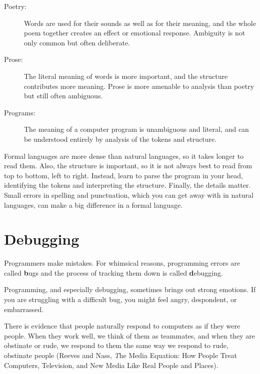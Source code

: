 \documentclass[
DIV=11,
fontsize=12,
twoside,
headinclude=false,
titlepage=firstiscover,
abstract=true,
headsepline=true,
footsepline=true,
chapterprefix=true, %
headings=big,
bibliography=totoc,%
captions=tableheading
]{scrbook}
\theoremstyle{definition}
\begin{document}
\begin{description}

\item[Poetry:] Words are used for their sounds as well as for
their meaning, and the whole poem together creates an effect or
emotional response.  Ambiguity is not only common but often
deliberate.

\item[Prose:] The literal meaning of words is more important,
and the structure contributes more meaning.  Prose is more amenable to
analysis than poetry but still often ambiguous.

\item[Programs:] The meaning of a computer program is unambiguous
and literal, and can be understood entirely by analysis of the
tokens and structure.

\end{description}

Formal languages are more dense
than natural languages, so it takes longer to read them.  Also, the
structure is important, so it is not always best to read
from top to bottom, left to right.  Instead, learn to parse the
program in your head, identifying the tokens and interpreting the
structure.  Finally, the details matter.  Small errors in
spelling and punctuation, which you can get away
with in natural languages, can make a big difference in a formal
language.


\section{Debugging}

Programmers make mistakes.  For whimsical reasons, programming errors
are called {\textbf bugs} and the process of tracking them down is called
{\textbf debugging}.

Programming, and especially debugging, sometimes brings out strong
emotions.  If you are struggling with a difficult bug, you might 
feel angry, despondent, or embarrassed.

There is evidence that people naturally respond to computers as if
they were people.  When they work well, we think
of them as teammates, and when they are obstinate or rude, we
respond to them the same way we respond to rude,
obstinate people (Reeves and Nass, {\textit The Media
    Equation: How People Treat Computers, Television, and New Media
    Like Real People and Places}).
\end{document}
